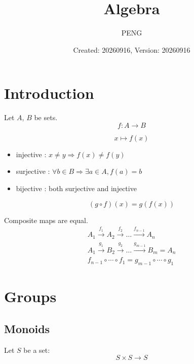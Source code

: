 \documentclass{article}
\title{Algebra}
\author{PENG}
\date{Created: 20260916, Version: 20260916}
\begin{document}
\maketitle
\tableofcontents
\section{Introduction}
\begin{definition}[mapping] Let $A$, $B$ be sets.
    \begin{equation}
        \label{eq:mapping}
        f : A \to B
    \end{equation}
\end{definition}

\begin{definition}[$f$]
    \begin{equation}
        \label{eq:fx}
        x \mapsto f(x)
    \end{equation}

    \begin{itemize}
        \item injective : $x \neq y \Rightarrow f(x) \neq f(y)$
        \item surjective : $\forall b \in B \Rightarrow \exists a \in A, f(a) = b$
        \item bijective : both surjective and injective
    \end{itemize}
\end{definition}

\begin{definition}
    \begin{equation}
        \label{eq:composite-map}
        (g \circ f)(x) = g(f(x))
    \end{equation}
\end{definition}

\begin{definition}[commutative]
    Composite maps are equal.
    \begin{gather*}
        A_{1} \xrightarrow{f_{1}} A_{2} \xrightarrow{f_{2}} \dots \xrightarrow{f_{n-1}} A_{n} \\
        A_{1} \xrightarrow{g_{1}} B_{2} \xrightarrow{g_{2}} \dots \xrightarrow{g_{m-1}} B_{m} = A_{n} \\
        f_{n-1} \circ \cdots \circ f_{1} = g_{m-1} \circ \cdots \circ g_{1}
    \end{gather*}
\end{definition}

\section{Groups}
\subsection{Monoids}
\begin{definition}
    Let $S$ be a set:
    \begin{equation}
        \label{eq:composition}
        S \times S \to S
    \end{equation}
\end{definition}

\begin{definition}[monoid]

\end{definition}

\printbibliography
\end{document}
